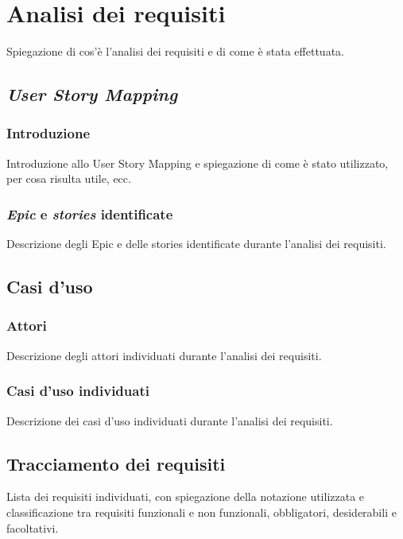 \section{Analisi dei requisiti}
\label{sez:analisi-dei-requisiti}

Spiegazione di cos'è l'analisi dei requisiti e di come è stata effettuata.\\

\subsection{\textit{User Story Mapping}}
\label{subsec:user-story-mapping}

\subsubsection{Introduzione}
\label{subsubsec:introduzione}

Introduzione allo User Story Mapping e spiegazione di come è stato utilizzato, per cosa risulta utile, ecc.\\

\subsubsection{\textit{Epic} e \textit{stories} identificate}
\label{subsubsec:epic-stories}

Descrizione degli Epic e delle stories identificate durante l'analisi dei requisiti.\\

\subsection{Casi d'uso}
\label{subsec:casi-duso}

\subsubsection{Attori}
\label{subsubsec:attori}

Descrizione degli attori individuati durante l'analisi dei requisiti.\\

\subsubsection{Casi d'uso individuati}
\label{subsubsec:casi-uso-individuati}

Descrizione dei casi d'uso individuati durante l'analisi dei requisiti.\\

\subsection{Tracciamento dei requisiti}
\label{subsec:requisiti}

Lista dei requisiti individuati, con spiegazione della notazione utilizzata e classificazione tra requisiti funzionali e non funzionali, obbligatori, desiderabili e facoltativi.\\